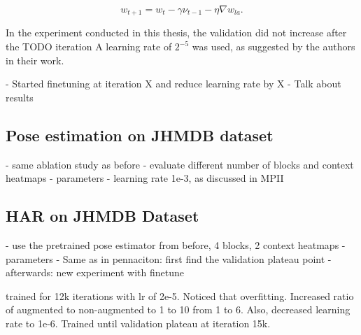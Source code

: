 \begin{equation}
    w_{t+1} = w_t - \gamma \nu_{t-1} - \eta \nabla w_{la}.
\end{equation}

In the experiment conducted in this thesis, the validation did not increase after the TODO iteration
A learning rate of $2^{-5}$ was used, as suggested by the authors in their work.

- Started finetuning at iteration X and reduce learning rate by X %
- Talk about results

\subsection{Pose estimation on JHMDB dataset}

- same ablation study as before
    - evaluate different number of blocks and context heatmaps
- parameters
    - learning rate 1e-3, as discussed in MPII



\subsection{HAR on JHMDB Dataset}
- use the pretrained pose estimator from before, 4 blocks, 2 context heatmaps
- parameters
- Same as in pennaciton: first find the validation plateau point
- afterwards: new experiment with finetune

trained for 12k iterations with lr of 2e-5. Noticed that overfitting. Increased ratio of augmented to non-augmented to 1 to 10 from 1 to 6. Also, decreased learning rate to 1e-6. Trained until validation plateau at iteration 15k.

